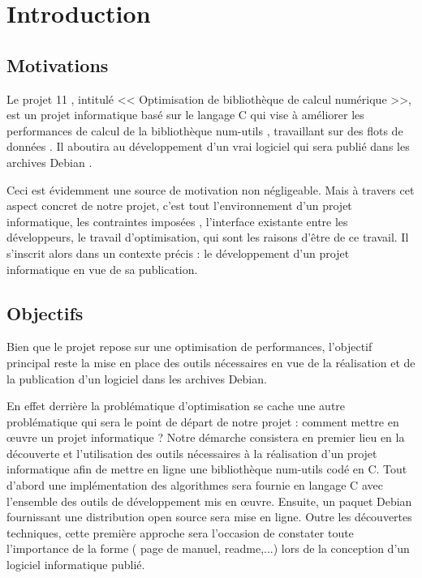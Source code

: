 \chapter{Introduction}
\label{chap:introduction}

\section{Motivations }

Le projet 11 \citep{projet11}, intitul\'e << Optimisation de biblioth\`eque de calcul num\'erique >>, est un projet informatique bas\'e sur le langage C qui vise \`a am\'eliorer 
les performances de calcul de la biblioth\`eque num-utils \citep{numutils}, travaillant sur des flots de donn\'ees \citep{dataflux}.
Il aboutira au d\'eveloppement d'un vrai logiciel qui sera publi\'e dans les archives Debian \citep{debian}.

Ceci est \'evidemment une source de motivation non n\'egligeable. Mais \`a travers cet aspect concret de notre projet, c'est tout l'environnement d'un 
projet informatique, les contraintes impos\'ees , l'interface existante entre les d\'eveloppeurs, le travail d'optimisation, qui sont les raisons 
d'\^etre de ce travail.
Il s'inscrit alors dans un contexte pr\'ecis : le d\'eveloppement d'un projet informatique en vue de sa publication.

\section{Objectifs}

Bien que le projet repose sur une optimisation de performances, l'objectif principal reste la mise en place des outils n\'ecessaires en vue de la 
r\'ealisation et de la publication d'un logiciel dans les archives Debian.  

En effet derri\`ere la probl\'ematique d'optimisation se cache une autre probl\'ematique qui sera le point de d\'epart de notre projet : comment mettre
 en \oe{}uvre un projet informatique ? 
Notre d\'emarche consistera en premier lieu en la d\'ecouverte et l'utilisation des outils n\'ecessaires \`a la r\'ealisation d'un projet informatique afin 
de mettre en ligne une biblioth\`eque num-utils cod\'e en C.
\newline 	
Tout d'abord une impl\'ementation des algorithmes sera fournie en langage C avec l'ensemble des outils de d\'eveloppement mis en \oe{}uvre. Ensuite, 
un paquet Debian fournissant une distribution open source sera mise en ligne. 
Outre les d\'ecouvertes techniques, cette premi\`ere approche sera l'occasion de constater toute l'importance de la forme ( page de manuel, readme,...) 
lors de la conception d'un logiciel informatique publi\'e.

